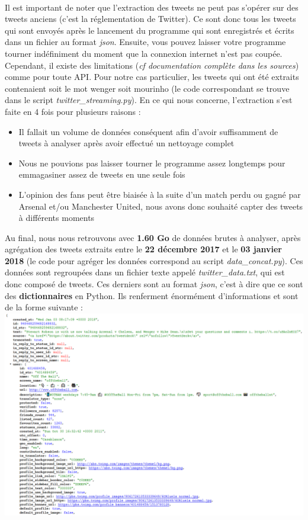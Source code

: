 \documentclass[14pt, openany]{article}
\begin{document}
\paragraph{}
Il est important de noter que l'extraction des tweets ne peut pas s'opérer sur des tweets anciens (c'est la réglementation de Twitter). Ce sont donc tous les tweets qui sont envoyés après le lancement du programme qui sont enregistrés et écrits dans un fichier au format \textit{json}. Ensuite, vous pouvez laisser votre programme tourner indéfiniment du moment que la connexion internet n'est pas coupée. Cependant, il existe des limitations (\textit{cf documentation complète dans les sources}) comme pour toute API. Pour notre cas particulier, les tweets qui ont été extraits contenaient soit le mot \og wenger \fg{} soit \og mourinho \fg{} (le code correspondant se trouve dans le script \textit{twitter\_streaming.py}). En ce qui nous concerne, l'extraction s'est faite en 4 fois pour plusieurs raisons :
\begin{itemize}
\item Il fallait un volume de données conséquent afin d'avoir suffisamment de tweets à analyser après avoir effectué un nettoyage complet
\item Nous ne pouvions pas laisser tourner le programme assez longtemps pour emmagasiner assez de tweets en une seule fois 
\item L'opinion des fans peut être biaisée à la suite d'un match perdu ou gagné par Arsenal et/ou Manchester United, nous avons donc souhaité capter des tweets à différents moments
\end{itemize}
Au final, nous nous retrouvons avec \textbf{1.60 Go} de données brutes à analyser, après agrégation des tweets extraits entre le \textbf{22 décembre 2017} et le \textbf{03 janvier 2018} (le code pour agréger les données correspond au script \textit{data\_concat.py}). Ces données sont regroupées dans un fichier texte appelé \textit{twitter\_data.txt}, qui est donc composé de tweets. Ces derniers sont au format \textit{json}, c'est à dire que ce sont des \textbf{dictionnaires} en Python. Ils renferment énormément d'informations et sont de la forme suivante :\\
\bigskip
\includegraphics[scale=0.55]{Images/json_file.png}
\end{document}
